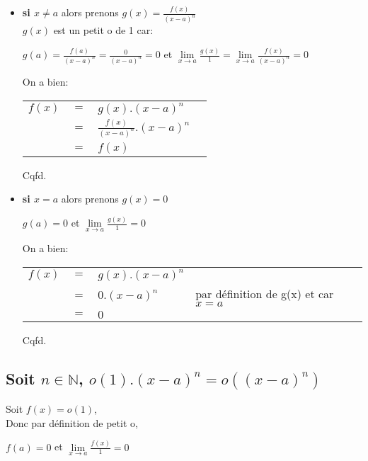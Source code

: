 \documentclass[a4paper,11pt]{report}
\begin{document}
\begin{itemize}
	\item \textbf{si $x \ne a$} alors prenons $g(x) = \frac{f(x)}{(x-a)^n}$\\
	$g(x)$ est un petit o de 1 car:
	\begin{center}
	$g(a) = \frac{f(a)}{(x-a)^n} = \frac{0}{(x-a)^n} = 0$ et $\lim\limits_{x \rightarrow a}{\frac{g(x)}{1} = \lim\limits_{x \rightarrow a}{\frac{f(x)}{(x-a)^n}} = 0}$\\
	\end{center}
	On a bien:\\
	\begin{center}
	\begin{tabular}{rcll}
	$f(x)$ & $=$ & $g(x).(x-a)^n$ &\\
	& $=$ & $\frac{f(x)}{(x-a)^n}.(x-a)^n$ & \\
	& $=$ & $f(x)$ & \\
	\end{tabular}
	\end{center}
	Cqfd.\\
	
	\item \textbf{si $x = a$} alors prenons $g(x) = 0$
	\begin{center}
	$g(a) = 0$ et $\lim\limits_{x \rightarrow a}{\frac{g(x)}{1} = 0}$\\
	\end{center}
	On a bien:
		\begin{center}
	\begin{tabular}{rcll}
	$f(x)$ & $=$ & $g(x).(x-a)^n$ &\\
	& $=$ & $0.(x-a)^n$ & par définition de g(x) et car $x = a$\\
	& $=$ & $0$ & \\
	\end{tabular}
	\end{center}
	Cqfd.
\end{itemize}

\subsection{Soit $n \in \mathbb{N}$, $o(1).(x-a)^n = o((x-a)^n)$}
Soit $f(x) = o(1)$,\\
Donc par définition de petit o,
\begin{center}
	$f(a) = 0$ et $\lim\limits_{x \rightarrow a}{\frac{f(x)}{1} = 0}$
\end{center}
\end{document}

